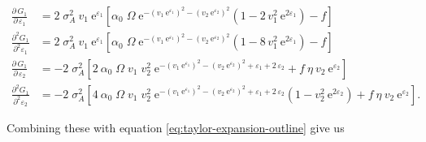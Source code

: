 \begin{equation*}
\begin{split}
    \frac{\partial \, G_1}{\partial \, \varepsilon_{1}} &= 2 \; \sigma_A^2 \: v_{1} \: \text{e}^{\varepsilon_{1}}
    \left[
        \alpha_0 \; \Omega \;
            \text{e}^{-(v_{1} \: \text{e}^{\varepsilon_{1}})^2 - (v_{2} \: \text{e}^{\varepsilon_{2}})^2}
            \left(
                1 - 2 \, v_{1}^2 \: \text{e}^{2 \varepsilon_{1}}
            \right)
        - f
    \right] \\
% 
    \frac{\partial^2 G_1}{\partial^2 \varepsilon_{1}} &= 2 \; \sigma_A^2 \: v_{1} \: \text{e}^{\varepsilon_{1}}
    \left[
        \alpha_0 \; \Omega \;
            \text{e}^{-(v_{1} \: \text{e}^{\varepsilon_{1}})^2 - (v_{2} \: \text{e}^{\varepsilon_{2}})^2}
            \left(
                1 - 8 \, v_{1}^2 \: \text{e}^{2 \varepsilon_{1}}
            \right)
        - f
    \right] \\[2ex]
%
%
    \frac{\partial \, G_1}{\partial \, \varepsilon_{2}} &= - 2 \; \sigma_A^2
    \left[
        2 \: \alpha_0 \; \Omega \; v_1 \; v_2^2 \;
            \text{e}^{-(v_{1} \: \text{e}^{\varepsilon_{1}})^2 - (v_{2} \: \text{e}^{\varepsilon_{2}})^2 + \varepsilon_{1} + 2 \, \varepsilon_{2}}
        + f \: \eta \: v_2 \: \text{e}^{\varepsilon_{2}}
    \right] \\
% 
    \frac{\partial^2 G_1}{\partial^2 \varepsilon_{2}} &= - 2 \; \sigma_A^2
    \left[
        4 \: \alpha_0 \; \Omega \; v_1 \; v_2^2 \;
            \text{e}^{-(v_{1} \: \text{e}^{\varepsilon_{1}})^2 - (v_{2} \: \text{e}^{\varepsilon_{2}})^2 + \varepsilon_{1} + 2 \, \varepsilon_{2}}
            \left(
                1 - v_{2}^2 \: \text{e}^{2 \varepsilon_{2}}
            \right)
        + f \: \eta \: v_2 \: \text{e}^{\varepsilon_{2}}
    \right]
\text{.}
\end{split}
\end{equation*}


Combining these with equation \ref{eq:taylor-expansion-outline} give us 


